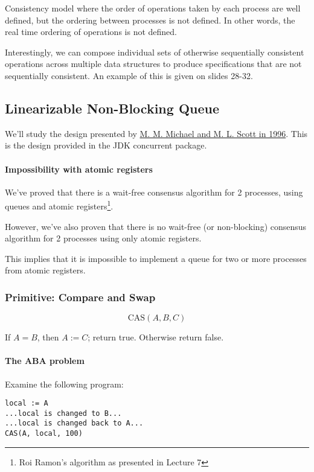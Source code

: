 \documentclass{idc_msc}
\begin{document}
Consistency model where the order of operations taken by each process are well defined, but the ordering between processes is not defined. In other words, the real time ordering of operations is not defined.

Interestingly, we can compose individual sets of otherwise sequentially consistent operations across multiple data structures to produce specifications that are not sequentially consistent. An example of this is given on slides 28-32.

\subsection{Linearizable Non-Blocking Queue}

We'll study the design presented by \href{https://www.cs.rochester.edu/~scott/papers/1996_PODC_queues.pdf}{M. M. Michael and M. L. Scott in 1996}.
This is the design provided in the JDK concurrent package.

\paragraph{Impossibility with atomic registers}
We've proved that there is a wait-free consensus algorithm for 2 processes, using queues and atomic registers\footnote{Roi Ramon's algorithm as presented in Lecture 7}.

However, we've also proven that there is no wait-free (or non-blocking) consensus algorithm for 2 processes using only atomic registers.

This implies that it is impossible to implement a queue for two or more processes from atomic registers.

\subsubsection{Primitive: Compare and Swap}

\[\text{CAS}( A, B, C)\]

If $A=B$, then $A := C$; return true. Otherwise return false.

\paragraph{The ABA problem}

Examine the following program:

\begin{lstlisting}[frame=L,mathescape=true]
local := A
...local is changed to B...
...local is changed back to A...
CAS(A, local, 100)
\end{lstlisting}
\end{document}
